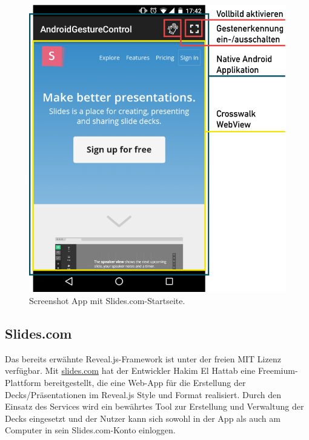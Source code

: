 \documentclass{article}
\begin{document}
\begin{figure}[htb]
\begin{minipage}[b]{1.0\linewidth}
  \centering
\centerline{\includegraphics[width=1\linewidth]{screenshot-ui-beschriftet.png}}
\end{minipage}
\caption{Screenshot App mit Slides.com-Startseite.}
\label{fig:ui}
\end{figure}

\subsection{Slides.com}
Das bereits erwähnte Reveal.js-Framework ist unter der freien MIT Lizenz verfügbar. Mit \url{slides.com} hat der Entwickler Hakim El Hattab eine Freemium-Plattform bereitgestellt, die eine Web-App für die Erstellung der Decks/Präsentationen im Reveal.js Style und Format realisiert. Durch den Einsatz des Services wird ein bewährtes Tool zur Erstellung und Verwaltung der Decks eingesetzt und der Nutzer kann sich sowohl in der App als auch am Computer in sein Slides.com-Konto einloggen.
\end{document}
